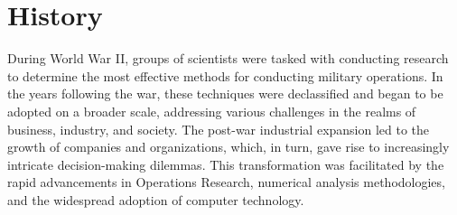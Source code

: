 \section{History}

During World War II, groups of scientists were tasked with conducting research to determine the most effective methods for conducting military operations. 
In the years following the war, these techniques were declassified and began to be adopted on a broader scale, addressing various challenges in the realms of business, industry, and society. 
The post-war industrial expansion led to the growth of companies and organizations, which, in turn, gave rise to increasingly intricate decision-making dilemmas. 
This transformation was facilitated by the rapid advancements in Operations Research, numerical analysis methodologies, and the widespread adoption of computer technology.